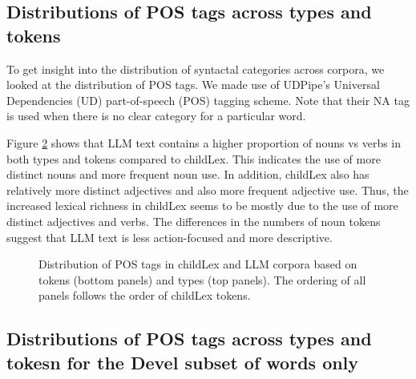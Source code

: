 \documentclass[manuscript]{stjour}
\begin{document}
\begin{figure}[!htbp]

    \label{fig:reliablity}
\end{figure}

\clearpage


\subsection{Distributions of POS tags across types and tokens}

To get insight into the distribution of syntactal categories across corpora, we looked at the distribution of POS tags. We made use of UDPipe's Universal Dependencies (UD) part-of-speech (POS) tagging scheme. Note that their NA tag is used when there is no clear category for a particular word. 

Figure \ref{fig:pos_f} shows that LLM text contains a higher proportion of nouns vs verbs in both types and tokens compared to childLex. This indicates the use of more distinct nouns and more frequent noun use. In addition, childLex also has relatively more distinct adjectives and also more frequent adjective use. Thus, the increased lexical richness in childLex seems to be mostly due to the use of more distinct adjectives and verbs. The differences in the numbers of noun tokens suggest that LLM text is less action-focused and more descriptive.

\begin{figure}[!htbp]
    \caption{Distribution of POS tags in childLex and LLM corpora based on tokens (bottom panels) and types (top panels). The ordering of all panels follows the order of childLex tokens. }
    \label{fig:pos_f}
\end{figure}

\clearpage


\subsection{Distributions of POS tags across types and tokesn for the Devel subset of words only}
\end{document}
